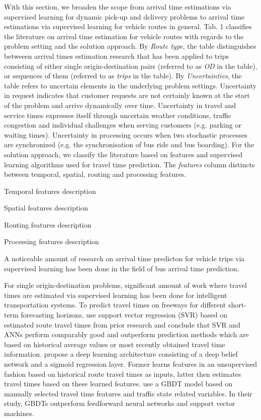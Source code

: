 With this section, we broaden the scope from arrival time estimations via supervised learning for dynamic pick-up and delivery problems to arrival time estimations via supervised learning for vehicle routes in general.
Tab. 1 classifies the literature on arrival time estimation for vehicle routes with regards to the problem setting and the solution approach. 
By \textit{Route type}, the table distinguishes betweeen arrival times estimation research that has been applied to trips consisting of either single origin-destination pairs (referred to as \textit{OD} in the table), or sequences of them (referred to as \textit{trips} in the table).
By \textit{Uncertainties}, the table refers to uncertain elements in the underlying problem settings. Uncertainty in request indicates that customer requests are not certainly known at the start of the problem and arrive dynamically over time. Uncertainty in travel and service times expresses itself through uncertain weather conditions, traffic congestion and individual challenges when serving customers (e.g. parking or waiting times). Uncertainty in processing occurs when two stochastic processes are synchronized (e.g. the synchronisation of bus ride and bus boarding). For the solution approach, we classify the literature based on features and supervised learning algorithms used for travel time prediction. The \textit{features} column distincts between temporal, spatial, routing and processing features.

Temporal features description

Spatial features description

Routing features description

Processing features description

A noticeable amount of research on arrival time predicton for vehicle trips via supervised learning has been done in the field of bus arrival time prediction. 

\cite{Chen2004_ANNKalman}

For single origin-destination problems, significant amount of work where travel times are estimated via supervised learning has been done for intelligent transportation systems. 
To predict travel times on freeways for different short-term forecasting horizons, \cite{Vanajakshi2007} use support vector regression (SVR) based on estimated route travel times from prior research and conclude that SVR and ANNs perform comparably good and outperform prediction methods which are based on historical average values or most recently obtained travel time information. 
\cite{Siripanpornchana2016_AnnWithDbnFS} propose a deep learning architecture consisting of a deep belief network and a sigmoid regression layer. Former learns features in an unsupervised fashion based on historical route travel times as inputs, latter then estimates travel times based on these learned features. \cite{Cheng2019_GBDT} use a GBDT model based on manually selected travel time features and traffic state related variables. In their study, GBDTs outperform feedforward neural networks and support vector machines.

